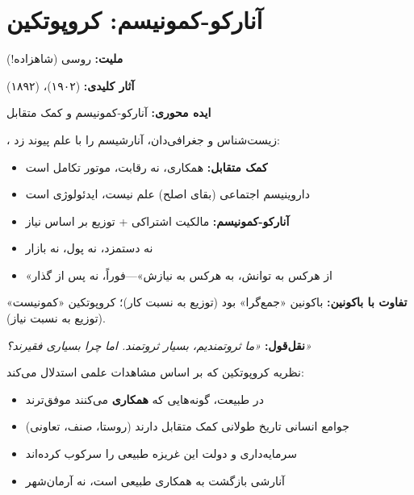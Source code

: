 \section{آنارکو-کمونیسم: کروپوتکین}

\begin{personbox}

\textbf{ملیت:} روسی (شاهزاده!)

\textbf{آثار کلیدی:}  (۱۹۰۲)،  (۱۸۹۲)

\textbf{ایده محوری:} آنارکو-کمونیسم و کمک متقابل

\mediumspace

، زیست‌شناس و جغرافی‌دان، آنارشیسم را با علم پیوند زد:

\begin{itemize}[nosep]
    \item \textbf{کمک متقابل:} همکاری، نه رقابت، موتور تکامل است
    \item داروینیسم اجتماعی (بقای اصلح) علم نیست، ایدئولوژی است
    \item \textbf{آنارکو-کمونیسم:} مالکیت اشتراکی + توزیع بر اساس نیاز
    \item نه دستمزد، نه پول، نه بازار
    \item «از هرکس به توانش، به هرکس به نیازش»—فوراً، نه پس از گذار
\end{itemize}

\mediumspace

\textbf{تفاوت با باکونین:} باکونین «جمع‌گرا» بود (توزیع به نسبت کار)؛ کروپوتکین «کمونیست» (توزیع به نسبت نیاز).

\mediumspace

\textbf{نقل‌قول:} \textit{«ما ثروتمندیم، بسیار ثروتمند. اما چرا بسیاری فقیرند؟»}
\end{personbox}

\begin{defbox}
نظریه کروپوتکین که بر اساس مشاهدات علمی استدلال می‌کند:
\begin{itemize}[nosep]
    \item در طبیعت، گونه‌هایی که \textbf{همکاری} می‌کنند موفق‌ترند
    \item جوامع انسانی تاریخ طولانی کمک متقابل دارند (روستا، صنف، تعاونی)
    \item سرمایه‌داری و دولت این غریزه طبیعی را سرکوب کرده‌اند
    \item آنارشی بازگشت به همکاری طبیعی است، نه آرمان‌شهر
\end{itemize}
\end{defbox}

